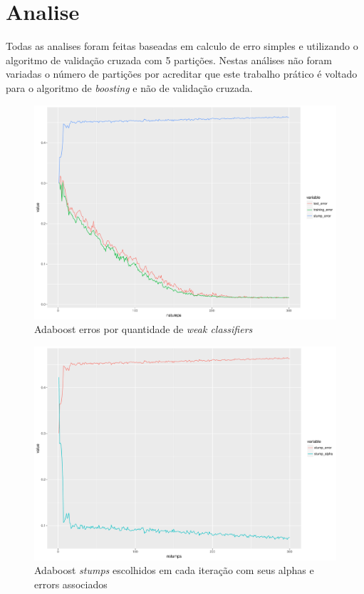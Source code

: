 \section{Analise}
Todas as analises foram feitas baseadas em calculo de erro simples e utilizando o algoritmo de validação cruzada com 5 partições. Nestas análises não foram variadas o número de partições por acreditar que este trabalho prático é voltado para o algoritmo de \emph{boosting} e não de validação cruzada.

\begin{figure}[h]
  \includegraphics[width=\linewidth]{imgs/accuracy.pdf}
  \caption{Adaboost erros por quantidade de \emph{weak classifiers}}
  \label{fig:adaboostAccuracy}
\end{figure}

\begin{figure}[h]
  \includegraphics[width=\linewidth]{imgs/alpha_error.pdf}
  \caption{Adaboost \emph{stumps} escolhidos em cada iteração com seus  alphas e errors  associados}
  \label{fig:adaboost_alphas}
\end{figure}
